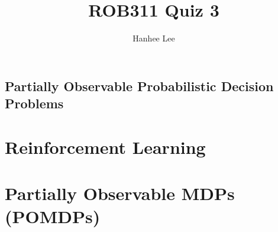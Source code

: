 \documentclass{article}
\title{ROB311 Quiz 3}
\author{Hanhee Lee}
\begin{document}
\maketitle

\tableofcontents
\newpage

\begin{center}
    \section*{Partially Observable Probabilistic Decision Problems}
\end{center}

\section{Reinforcement Learning}


\section{Partially Observable MDPs (POMDPs)}

\newpage
\end{document}

